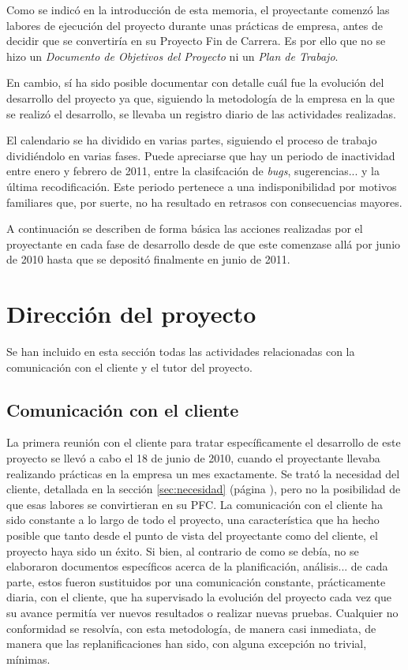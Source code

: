 Como se indicó en la introducción de esta memoria, el proyectante comenzó las
labores de ejecución del proyecto durante unas prácticas de empresa, antes de
decidir que se convertiría en su Proyecto Fin de Carrera. Es por ello que no se
hizo un \textit{Documento de Objetivos del Proyecto} ni un \textit{Plan de
Trabajo}.

En cambio, sí ha sido posible documentar con detalle cuál fue la evolución del
desarrollo del proyecto ya que, siguiendo la metodología de la empresa en la
que se realizó el desarrollo, se llevaba un registro diario de las actividades
realizadas.

El calendario se ha dividido en varias partes, siguiendo el proceso de trabajo
dividiéndolo en varias fases. Puede apreciarse que hay un periodo de
inactividad entre enero y febrero de 2011, entre la clasifcación de
\textit{bugs}, sugerencias... y la última recodificación. Este periodo
pertenece a una indisponibilidad por motivos familiares que, por suerte, no ha
resultado en retrasos con consecuencias mayores.

A continuación se describen de forma básica las acciones realizadas
por el proyectante en cada fase de desarrollo desde de que este comenzase allá
por junio de 2010 hasta que se depositó finalmente en junio de 2011. 

\section{Dirección del proyecto}

Se han incluido en esta sección todas las
actividades relacionadas con la comunicación con el cliente y el tutor del
proyecto.

\subsection{Comunicación con el cliente}

La primera reunión con el cliente para tratar específicamente el desarrollo de
este proyecto se llevó a cabo el 18 de junio de 2010, cuando el proyectante
llevaba realizando prácticas en la empresa un mes exactamente. Se trató la
necesidad del cliente, detallada en la sección \ref{sec:necesidad} (página
\pageref{sec:necesidad}), pero no la posibilidad de que esas labores se
convirtieran en su PFC.
La comunicación con el cliente ha sido constante a lo largo de todo el
proyecto, una característica que ha hecho posible que tanto desde el punto de
vista del proyectante como del cliente, el proyecto haya sido un éxito. Si
bien, al contrario de como se debía, no se elaboraron documentos específicos
acerca de la planificación, análisis... de cada parte, estos fueron sustituidos
por una comunicación constante, prácticamente diaria, con el cliente, que ha
supervisado la evolución del proyecto cada vez que su avance permitía ver
nuevos resultados o realizar nuevas pruebas. Cualquier no conformidad se
resolvía, con esta metodología, de manera casi inmediata, de manera que las
replanificaciones han sido, con alguna excepción no trivial, mínimas.

